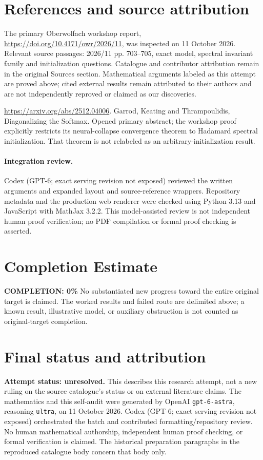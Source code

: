 \documentclass[11pt]{article}
\begin{document}
\section{References and source attribution}
The primary Oberwolfach workshop report, \url{https://doi.org/10.4171/owr/2026/11}, was inspected on 11 October 2026. Relevant source passages: 2026/11 pp. 703--705, exact model, spectral invariant family and initialization questions. Catalogue and contributor attribution remain in the original Sources section. Mathematical arguments labeled as this attempt are proved above; cited external results remain attributed to their authors and are not independently reproved or claimed as our discoveries.

\url{https://arxiv.org/abs/2512.04006}. Garrod, Keating and Thrampoulidis, Diagonalizing the Softmax. Opened primary abstract; the workshop proof explicitly restricts its neural-collapse convergence theorem to Hadamard spectral initialization. That theorem is not relabeled as an arbitrary-initialization result.


\paragraph{Integration review.} Codex (GPT-6; exact serving revision not exposed) reviewed the written arguments and expanded layout and source-reference wrappers. Repository metadata and the production web renderer were checked using Python 3.13 and JavaScript with MathJax 3.2.2. This model-assisted review is not independent human proof verification; no PDF compilation or formal proof checking is asserted.

\section{Completion Estimate}
\noindent\textbf{COMPLETION: 0\%}
No substantiated new progress toward the entire original target is claimed. The worked results and failed route are delimited above; a known result, illustrative model, or auxiliary obstruction is not counted as original-target completion.

\section{Final status and attribution}
\textbf{Attempt status: unresolved.} This describes this research attempt, not a new ruling on the source catalogue's status or on external literature claims.
The mathematics and this self-audit were generated by OpenAI \texttt{gpt-6-astra}, reasoning \texttt{ultra}, on 11 October 2026. Codex (GPT-6; exact serving revision not exposed) orchestrated the batch and contributed formatting/repository review. No human mathematical authorship, independent human proof checking, or formal verification is claimed. The historical preparation paragraphs in the reproduced catalogue body concern that body only.
\end{document}
